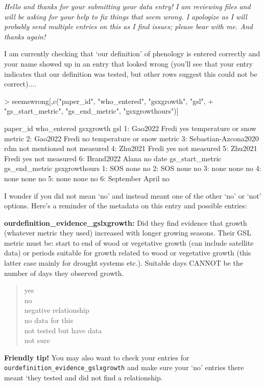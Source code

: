 \documentclass[11pt]{article}
\begin{document}
\renewcommand{\refname}{\CHead{}}

\emph{Hello and thanks for your submitting your data entry! I am reviewing files and will be asking for your help to fix things that seem wrong. I apologize as I will probably send multiple entries on this as I find issues; please bear with me. And thanks again!}

I am currently checking that `our definition' of phenology is entered correctly and your name showed up in an entry that looked wrong (you'll see that your entry indicates that our definition was tested, but other rows suggest this could not be correct)....


\begin{Schunk}
\begin{Sinput}
> seemswrong[,c("paper_id", "who_entered", "gsxgrowth", "gsl", 
+ 	"gs_start_metric", "gs_end_metric", "gsxgrowthours")]
\end{Sinput}
\begin{Soutput}
               paper_id who_entered     gsxgrowth                        gsl
1:              Gao2022       Fredi           yes temperature or snow metric
2:              Gao2022       Fredi            no temperature or snow metric
3: Sebastian-Azcona2020         rdm not mentioned               not measured
4:              Zhu2021       Fredi           yes               not measured
5:              Zhu2021       Fredi           yes               not measured
6:            Brand2022       Alana            no                       date
   gs_start_metric gs_end_metric gsxgrowthours
1:             SOS          none            no
2:             SOS          none            no
3:            none          none            no
4:            none          none            no
5:            none          none            no
6:       September         April            no
\end{Soutput}
\end{Schunk}

I wonder if you did not mean `no' and instead meant one of the other `no' or `not' options. Here's a reminder of the metadata on this entry and possible entries:

{\bf ourdefinition\_evidence\_gslxgrowth:} Did they find evidence that growth (whatever metric they used) increased with longer growing seasons. Their GSL metric must be: start to end of wood or vegetative growth (can include satellite data) or periods suitable for growth related to wood or vegetative growth (this latter case mainly for drought systems etc.). Suitable days CANNOT be the number of days they observed growth. 
\begin{quote}
	yes\\
	no\\
	negative relationship\\
	no data for this\\
	not tested but have data\\
	not sure\\
\end{quote}

{\bf Friendly tip!} You may also want to check your entries for \verb|ourdefinition_evidence_gslxgrowth| and make sure your `no' entries there meant `they tested and did not find a relationship. 
\end{document}
